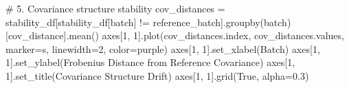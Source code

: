 \documentclass[
  letterpaper,
  DIV=11,
  numbers=noendperiod]{scrartcl}
\newenvironment{Shaded}{\begin{snugshade}}{\end{snugshade}}
\newcommand{\CommentTok}[1]{\textcolor[rgb]{0.37,0.37,0.37}{#1}}
\newcommand{\DecValTok}[1]{\textcolor[rgb]{0.68,0.00,0.00}{#1}}
\newcommand{\FloatTok}[1]{\textcolor[rgb]{0.68,0.00,0.00}{#1}}
\newcommand{\NormalTok}[1]{\textcolor[rgb]{0.00,0.23,0.31}{#1}}
\newcommand{\OperatorTok}[1]{\textcolor[rgb]{0.37,0.37,0.37}{#1}}
\newcommand{\StringTok}[1]{\textcolor[rgb]{0.13,0.47,0.30}{#1}}
\newcommand{\VariableTok}[1]{\textcolor[rgb]{0.07,0.07,0.07}{#1}}
\renewenvironment{Shaded}{%
  \begin{tcolorbox}[%
    enhanced,%
    colback=codebg,%
    colframe=codebg,%
    borderline west={3pt}{0pt}{sectionblue},%
    fontupper=\small\ttfamily,%
    boxrule=0pt,%
    arc=0pt,%
    boxsep=5pt,%
    left=2mm,%
    right=2mm,%
    top=2mm,%
    bottom=2mm%
  ]%
}{%
  \end{tcolorbox}%
}
\begin{document}
\begin{Shaded}
\begin{Highlighting}[]
\CommentTok{\# 5. Covariance structure stability}
\NormalTok{cov\_distances }\OperatorTok{=}\NormalTok{ stability\_df[stability\_df[}\StringTok{\textquotesingle{}batch\textquotesingle{}}\NormalTok{] }\OperatorTok{!=}\NormalTok{ reference\_batch].groupby(}\StringTok{\textquotesingle{}batch\textquotesingle{}}\NormalTok{)[}\StringTok{\textquotesingle{}cov\_distance\textquotesingle{}}\NormalTok{].mean()}
\NormalTok{axes[}\DecValTok{1}\NormalTok{, }\DecValTok{1}\NormalTok{].plot(cov\_distances.index, cov\_distances.values, marker}\OperatorTok{=}\StringTok{\textquotesingle{}s\textquotesingle{}}\NormalTok{, linewidth}\OperatorTok{=}\DecValTok{2}\NormalTok{, color}\OperatorTok{=}\StringTok{\textquotesingle{}purple\textquotesingle{}}\NormalTok{)}
\NormalTok{axes[}\DecValTok{1}\NormalTok{, }\DecValTok{1}\NormalTok{].set\_xlabel(}\StringTok{\textquotesingle{}Batch\textquotesingle{}}\NormalTok{)}
\NormalTok{axes[}\DecValTok{1}\NormalTok{, }\DecValTok{1}\NormalTok{].set\_ylabel(}\StringTok{\textquotesingle{}Frobenius Distance from Reference Covariance\textquotesingle{}}\NormalTok{)}
\NormalTok{axes[}\DecValTok{1}\NormalTok{, }\DecValTok{1}\NormalTok{].set\_title(}\StringTok{\textquotesingle{}Covariance Structure Drift\textquotesingle{}}\NormalTok{)}
\NormalTok{axes[}\DecValTok{1}\NormalTok{, }\DecValTok{1}\NormalTok{].grid(}\VariableTok{True}\NormalTok{, alpha}\OperatorTok{=}\FloatTok{0.3}\NormalTok{)}


\end{Highlighting}
\end{Shaded}
\end{document}
